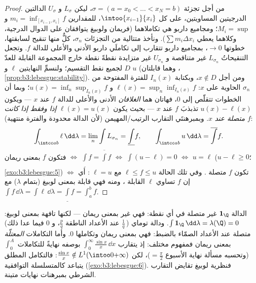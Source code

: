 \begin{proof}
من أجل تجزئة $\sigma = (a = x_0 < \dots < x_N = b)$، ليكن $L_\sigma$ و $U_\sigma$ الدالتين
الدرجيتين المساويتين، على كل $\intoo{x_{i-1}}{x_i}$، للمقدارين $m_i = \inf_{[x_{i-1}, x_i]}f$
و $M_i = \sup$؛ ومجاميع داربو هي تكاملاهما (فريمان ولوبيغ
يتوافقان على الدوال الدرجية، وكلاهما يعطي $\sum
m_i\Delta x_i$). ونأخذ متتالية
من التجزئات $\sigma_n$، كلٌّ منها تنقيح لسابقتها، خطوتها
$\to 0$، بمجاميع داربو تتقارب إلى تكاملَي داربو الأدنى والأعلى
للدالة $f$. وتجعل التنقيحاتُ $L_{\sigma_n}$ غير متناقصة
و $U_{\sigma_n}$ غير متزايدة نقطةً نقطة خارج المجموعة القابلة للعدّ
$D$ لجميع نقط التقسيم؛ ولنسمِّ النهايتين $\ell$ و $u$ (وهما
قابلتان ، \cref{prop:b3:lebesgue:stability}). ومن أجل $x \notin
D$، وبكتابة $I_n(x)$
للفترة المفتوحة من $\sigma_n$ الحاوية على $x$: $\ell(x) = \sup_n\inf_{I_n(x)}f$ و $u(x) =
\inf_n\sup_{I_n(x)}f$؛
وبما أن الخطوات تتقلّص إلى $0$، فهاتان هما \emph{الغلافان}
الأدنى والأعلى للدالة $f$ عند $x$ --- ويكون $u(x) - \ell(x)$
تذبذبَ $f$ عند $x$ --- بحيث يكون \emph{$\ell(x) = u(x)$ إذا
وفقط إذا كانت $f$ متصلة عند $x$}. وبمبرهنتَي التقارب
الرتيب/المهيمن (لأن الدالة محدودة والفترة منتهية):
\[
\int_{\intcc ab}\ell\,\dd\lambda = \lim_n\int L_{\sigma_n}
= \underline{\int}f,
\qquad
\int_{\intcc ab}u\,\dd\lambda = \overline{\int}f .
\]
فتكون $f$  بمعنى ريمان $\iff$ $\underline\int f =
\overline\int f$ $\iff$
$\int(u - \ell) = 0$ $\iff$ $u = \ell$  ($u - \ell \geq 0$؛
\cref{exo:b3:lebesgue:5}) $\iff$ تكون $f$ متصلة . وفي تلك
الحالة $\ell \leq f \leq u$ مع $\ell =
u$ : أي إن $f$ تساوي
$\ell$ القابلة  ، ومنه فهي قابلة 
بمعنى لوبيغ (بتمام $\lambda$) مع $\int f\,\dd\lambda = \int\ell\,\dd\lambda = \underline\int f =
\int_a^bf$.
\end{proof}

\begin{example}\label{ex:b3:lebesgue:riemannexamples}
الدالة $\mathbf 1_\Q$ غير متصلة في أي نقطة: فهي غير  بمعنى ريمان --- لكنها تافهة بمعنى لوبيغ: $\int\mathbf 1_\Q\,\dd\lambda =
\lambda(\Q) = 0$. ودالة
توماي (\,$\frac1q$ عند الأعداد الناطقة $\frac pq$، و $0$ فيما
عدا ذلك) متصلة عند الأعداد الصمّاء بالضبط: فهي 
بمعنى ريمان وتكاملها $0$. وأما التكاملات \emph{المعتلّة} بمعنى
ريمان فمفهوم مختلف: إذ يتقارب $\int_0^\infty\frac{\sin x}x\,\dd x$ بوصفه نهايةً للتكاملات
$\int_0^A$ (وتحسبه مسألة نهاية الأسبوع $= \frac\pi2$)، لكن
$\frac{\sin x}x \notin L^1(\intoo0{+\infty})$: فالتكامل المطلق يتباعد كالمتسلسلة التوافقية
(\cref{exo:b3:lebesgue:6}). فنظرية لوبيغ تقايض التقارب الشرطي بمبرهنات
نهايات متينة.
\end{example}

